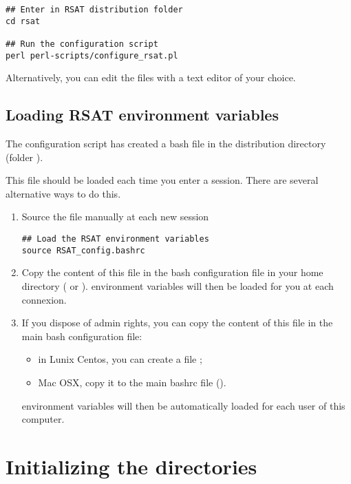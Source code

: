 \documentclass[12pt,a4paper, oneside]{scrreprt} %
\begin{document}
\begin{lstlisting}
## Enter in RSAT distribution folder
cd rsat

## Run the configuration script
perl perl-scripts/configure_rsat.pl
\end{lstlisting}

Alternatively, you can edit the files with a text editor of your
choice.

\subsection{Loading RSAT environment variables}

The configuration script has created a bash file
 in the \RSAT distribution directory (folder
). 

This file should be loaded each time you enter a session. There are
several alternative ways to do this.

\begin{enumerate}

\item Source the file manually at each new session

\begin{lstlisting}
## Load the RSAT environment variables
source RSAT_config.bashrc
\end{lstlisting}

\item Copy the content of this file in the bash configuration file in
  your home directory ( or
  ). \RSAT environment variables will then be
  loaded for you at each connexion.

\item If you dispose of admin rights, you can copy the content of this
  file in the main bash configuration file: 
  \begin {itemize}
  \item in Lunix Centos, you can create a file
    ; 
  \item Mac OSX, copy it to the main bashrc file ().
  \end{itemize}
  \RSAT environment variables will then be automatically loaded for
  each user of this computer.
\end{enumerate}



\section{Initializing the directories}
\end{document}
